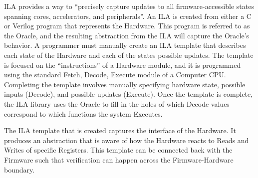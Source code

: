 \documentclass[../report.tex]{subfiles}
\begin{document}
ILA provides a way to ``precisely capture updates to all firmware-accessible
states spanning cores, accelerators, and peripherals''\cite{ila-template}.
An ILA is created from either a C or Verilog program that represents the
Hardware.
This program is referred to as the Oracle, and the resulting abstraction from
the ILA will capture the Oracle's behavior. %
A programmer must manually create an ILA template that describes each state of
the Hardware and each of the states possible updates.
The template is focused on the ``instructions'' of a Hardware module, and it is
programmed using the standard Fetch, Decode, Execute module of a Computer CPU\@. 
Completing the template involves manually specifying hardware state, possible
inputs (Decode), and possible updates (Execute).
Once the template is complete, the ILA library uses the Oracle to fill in the
holes of which Decode values correspond to which functions the system Executes.

The ILA template that is created captures the interface of the Hardware.
It produces an abstraction that is aware of how the Hardware reacts to Reads and
Writes of specific Registers.
This template can be connected back with the Firmware such that verification can
happen across the Firmware-Hardware boundary.
\end{document}
